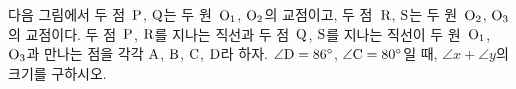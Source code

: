 다음 그림에서 두 점~$\mathrm{P}$, $\mathrm{Q}$는 두 원~$\mathrm{O_1}$, $\mathrm{O_2}$의 교점이고, 두 점~$\mathrm{R}$, $\mathrm{S}$는 두 원~$\mathrm{O_2}$, $\mathrm{O_3}$의 교점이다. 두 점~$\mathrm{P}$, $\mathrm{R}$를 지나는 직선과 두 점~$\mathrm{Q}$, $\mathrm{S}$를 지나는 직선이 두 원~$\mathrm{O_1}$, $\mathrm{O_3}$과 만나는 점을 각각 $\mathrm{A}$, $\mathrm{B}$, $\mathrm{C}$, $\mathrm{D}$라 하자. $\angle\mathrm{D}=86^\circ$, $\angle\mathrm{C}=80^\circ$일 때, $\angle x+\angle y$의 크기를 구하시오.
\par\smallskip\begin{center}\resizebox{\ifdim\width>\linewidth\linewidth\else\width\fi}{!}{}\end{center}
